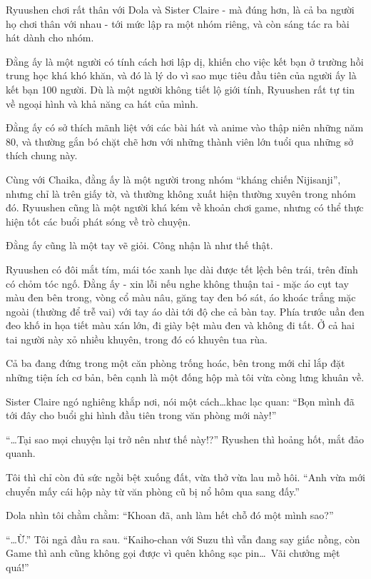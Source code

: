 \documentclass[../main.tex]{subfiles}
\begin{document}
Ryuushen chơi rất thân với Dola và Sister Claire - mà đúng hơn, là cả ba người họ chơi thân với nhau - tới mức lập ra một nhóm riêng, và còn sáng tác ra bài hát dành cho nhóm.

Đằng ấy là một người có tính cách hơi lập dị, khiến cho việc kết bạn ở trường hồi trung học khá khó khăn, và đó là lý do vì sao mục tiêu đầu tiên của người ấy là kết bạn 100 người. Dù là một người không tiết lộ giới tính, Ryuushen rất tự tin về ngoại hình và khả năng ca hát của mình.

Đằng ấy có sở thích mãnh liệt với các bài hát và anime vào thập niên những năm 80, và thường gắn bó chặt chẽ hơn với những thành viên lớn tuổi qua những sở thích chung này.

Cùng với Chaika, đằng ấy là một người trong nhóm ``kháng chiến Nijisanji'', nhưng chỉ là trên giấy tờ, và thường không xuất hiện thường xuyên trong nhóm đó. Ryuushen cũng là một người khá kém về khoản chơi game, nhưng có thể thực hiện tốt các buổi phát sóng về trò chuyện.

Đằng ấy cũng là một tay vẽ giỏi. Công nhận là như thế thật.

Ryuushen có đôi mắt tím, mái tóc xanh lục dài được tết lệch bên trái, trên đỉnh có chỏm tóc ngố. Đằng ấy - xin lỗi nếu nghe không thuận tai - mặc áo cụt tay màu đen bên trong, vòng cổ màu nâu, găng tay đen bó sát, áo khoác trắng mặc ngoài (thường để trễ vai) với tay áo dài tới độ che cả bàn tay. Phía trước uần đen đeo khố in họa tiết màu xán lớn, đi giày bệt màu đen và không đi tất. Ở cả hai tai người này xỏ nhiều khuyên, trong đó có khuyên tua rùa.

\chrint

Cả ba đang đứng trong một căn phòng trống hoác, bên trong mới chỉ lắp đặt những tiện ích cơ bản, bên cạnh là một đống hộp mà tôi vừa còng lưng khuân về.


Sister Claire ngó nghiêng khắp nơi, nói một cách\dots khac lạc quan: ``Bọn mình đã tới đây cho buổi ghi hình đầu tiên trong văn phòng mới này!''

``\dots Tại sao mọi chuyện lại trở nên như thế này!?'' Ryushen thì hoảng hốt, mắt đảo quanh.

Tôi thì chỉ còn đủ sức ngồi bệt xuống đất, vừa thở vừa lau mồ hôi. ``Anh vừa mới chuyển mấy cái hộp này từ văn phòng cũ bị nổ hôm qua sang đấy.''

Dola nhìn tôi chằm chằm: ``Khoan đã, anh làm hết chỗ đó một mình sao?''

``\dots Ừ.'' Tôi ngả đầu ra sau. ``Kaiho-chan với Suzu thì vẫn đang say giấc nồng, còn Game thì anh cũng không gọi được vì quên không sạc pin\dots\ Vãi chưởng mệt quá!''
\end{document}
